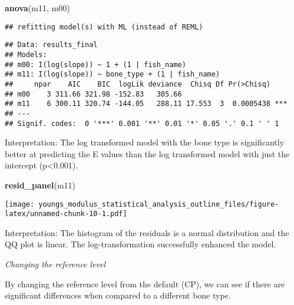 \documentclass[
]{article}
\newenvironment{Shaded}{\begin{snugshade}}{\end{snugshade}}
\newcommand{\FunctionTok}[1]{\textcolor[rgb]{0.13,0.29,0.53}{\textbf{#1}}}
\newcommand{\NormalTok}[1]{#1}
\begin{document}
\begin{Shaded}
\begin{Highlighting}[]
\FunctionTok{anova}\NormalTok{(m11, m00)}
\end{Highlighting}
\end{Shaded}

\begin{verbatim}
## refitting model(s) with ML (instead of REML)
\end{verbatim}

\begin{verbatim}
## Data: results_final
## Models:
## m00: I(log(slope)) ~ 1 + (1 | fish_name)
## m11: I(log(slope)) ~ bone_type + (1 | fish_name)
##     npar    AIC    BIC  logLik deviance  Chisq Df Pr(>Chisq)    
## m00    3 311.66 321.98 -152.83   305.66                         
## m11    6 300.11 320.74 -144.05   288.11 17.553  3  0.0005438 ***
## ---
## Signif. codes:  0 '***' 0.001 '**' 0.01 '*' 0.05 '.' 0.1 ' ' 1
\end{verbatim}

Interpretation: The log transformed model with the bone type is
significantly better at predicting the E values than the log transformed
model with just the intercept (p\textless0.001).

\begin{Shaded}
\begin{Highlighting}[]
\FunctionTok{resid\_panel}\NormalTok{(m11)}
\end{Highlighting}
\end{Shaded}

\texttt{[image: youngs\_modulus\_statistical\_analysis\_outline\_files/figure-latex/unnamed-chunk-10-1.pdf]}

Interpretation: The histogram of the residuals is a normal distribution
and the QQ plot is linear. The log-transformation successfully enhanced
the model.

\emph{Changing the reference level }

By changing the reference level from the default (CP), we can see if
there are significant differences when compared to a different bone
type.
\end{document}

